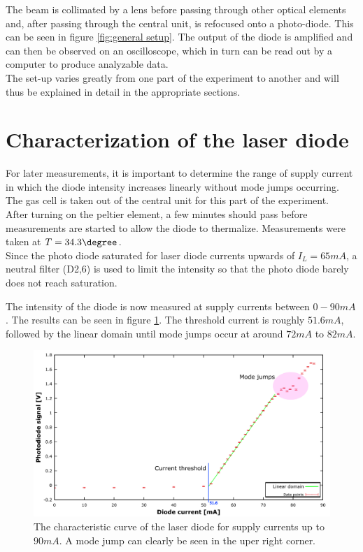 The beam is collimated by a lens before passing through other optical elements and, after passing through the central unit, is refocused onto a photo-diode. This can be seen in figure \ref{fig:general setup}. The output of the diode is amplified and can then be observed on an oscilloscope, which in turn can be read out by a computer to produce analyzable data.\\ 

The set-up varies greatly from one part of the experiment to another and will thus be explained in detail in the appropriate sections.


\section{Characterization of the laser diode}
For later measurements, it is important to determine the range of supply current in which the diode intensity increases linearly without mode jumps occurring. The gas cell is taken out of the central unit for this part of the experiment. \\

After turning on the peltier element, a few minutes should pass before measurements are started to allow the diode to thermalize. Measurements were taken at $T=\unit{34.3}{\degree}$.\\
Since the photo diode saturated for laser diode currents upwards of $I_L=\unit{65}{mA}$, a neutral filter (D2,6) is used to limit the intensity so that the photo diode barely does not reach saturation.

The intensity of the diode is now measured at supply currents between $\unit{0-90}{mA}$. The results can be seen in figure \ref{fig:characterization}. The threshold current is roughly $\unit{51.6}{mA}$, followed by the linear domain until mode jumps occur at around $\unit{72}{mA}$ to $\unit{82}{mA}$. 
\begin{figure}[htb]
\centering
\includegraphics[width=1.0\linewidth]{graphics/characterization}
\caption[Characteristic curve of the laser diode]{The characteristic curve of the laser diode for supply currents up to $\unit{90}{mA}$. A mode jump can clearly be seen in the uper right corner.}
\label{fig:characterization}
\end{figure}





